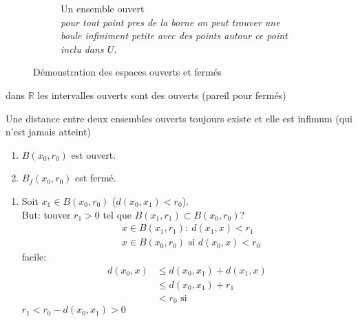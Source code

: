 \documentclass[a4paper]{report}
\newcommand\R{\ensuremath{\mathbb{R}}}
\theoremstyle{definition}
\begin{document}
\begin{figure}[H]
\begin{subfigure}{0.45\textwidth}
        \caption{Un ensemble ouvert\\
            \textit{
                pour tout point pres de la borne
                on peut trouver une boule
                infiniment petite avec des
                points autour ce point inclu dans $U$.
            }
        }

    \end{subfigure}
    \caption{Démonstration des espaces ouverts et fermés}
\end{figure}
\begin{remark}
   dans $\R$ les intervalles ouverts sont des ouverts (pareil pour fermés) 
\end{remark}
\begin{remark}
   Une distance entre deux ensembles ouverts toujours existe et elle est infimum (qui n'est jamais atteint) 
\end{remark}
\begin{lemma}
   \begin{enumerate}
       \item $B(x_0, r_0)$ est ouvert.
       \item $B_f(x_0, r_0)$ est fermé.
   \end{enumerate} 
\end{lemma}
\begin{preuve}
   \begin{enumerate}
       \item Soit $x_1 \in B(x_0, r_0)$ ($d(x_0, x_1) < r_0$).\\
           But: touver $r_1 > 0$ tel que $B(x_1, r_1) \subset B(x_0, r_0)$?\\
           \begin{align*}
               &x \in B(x_1, r_1): \: d(x_1, x) < r_1\\
               &x \in B(x_0, r_0) \text{ si } d(x_0, x) < r_0
           \end{align*}
           facile:
           \begin{align*}
               d(x_0, x) &\le d(x_0, x_1) + d(x_1, x)\\
                         &\le d(x_0, x_1) + r_1\\
                         &< r_0 \text{ si}
           \end{align*}
           $r_1 < r_0 - d(x_0, x_1) > 0$
   \end{enumerate} 
\end{preuve}
\end{document}
